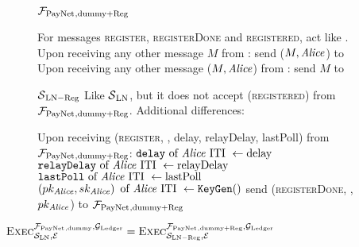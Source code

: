 \begin{figure}[!htbp]
  \begin{systembox}{$\mathcal{F}_{\mathrm{PayNet}}{}_{\mathrm{, dummy + Reg}}$}
    \begin{algorithmic}[1]
      \State For messages \textsc{register}, \textsc{registerDone} and
      \textsc{registered}, act like \fpaynet{}.
      \State Upon receiving any other message $M$ from \alice: send ($M,
      \mathit{Alice}$) to \simulator
      \State Upon receiving any other message ($M, \mathit{Alice}$) from \simulator:
      send $M$ to \alice
    \end{algorithmic}
  \end{systembox}
  \caption{}
  \label{alg:fpaynet:reg}
\end{figure}

\begin{figure}[!htbp]
  \begin{simulatorbox}{$\mathcal{S}{}_{\mathrm{LN - Reg}}$}
    Like $\mathcal{S}{}_{\mathrm{LN}}$, but it does not accept
    (\textsc{registered}) from $\mathcal{F}_{\mathrm{PayNet}}{}_{\mathrm{, dummy + Reg}}$. Additional
    differences:
    \begin{algorithmic}[1]
      \State Upon receiving (\textsc{register}, \alice, delay, relayDelay,
      lastPoll) from $\mathcal{F}_{\mathrm{PayNet}}{}_{\mathrm{, dummy + Reg}}$:
      \Indent
        \State $\mathtt{delay} \text{ of \ensuremath{\mathit{Alice}}{} ITI } \gets \mathrm{delay}$
        \label{alg:sim:reg:delay}
        \State $\mathtt{relayDelay} \text{ of \ensuremath{\mathit{Alice}}{} ITI } \gets
        \mathrm{relayDelay}$
        \State $\mathtt{lastPoll} \text{ of \ensuremath{\mathit{Alice}}{} ITI } \gets
        \mathrm{lastPoll}$
        \State $\left(pk_{\mathit{Alice}}, sk_{\mathit{Alice}}\right) \text{ of \ensuremath{\mathit{Alice}}{} ITI }
        \gets \mathtt{KeyGen}()$
        \label{alg:sim:reg:keygen}
        \State send (\textsc{registerDone}, \alice, $pk_{\mathit{Alice}}$) to
        $\mathcal{F}_{\mathrm{PayNet}}{}_{\mathrm{, dummy + Reg}}$
      \EndIndent
    \end{algorithmic}
  \end{simulatorbox}
  \caption{}
  \label{alg:sim:reg}
\end{figure}

\begin{lemma}
  \label{lemma:reg}
  $\textsc{Exec}^{\mathcal{F}_{\mathrm{PayNet}}{}_{\mathrm{, dummy}},
  \mathcal{G}_{\mathrm{Ledger}}}_{\mathcal{S}_{\mathrm{LN}}, \mathcal{E}} =
  \textsc{Exec}^{\mathcal{F}_{\mathrm{PayNet}}{}_{\mathrm{, dummy + Reg}},
  \mathcal{G}_{\mathrm{Ledger}}}_{\mathcal{S}_{\mathrm{LN - Reg}}, \mathcal{E}}$
\end{lemma}

